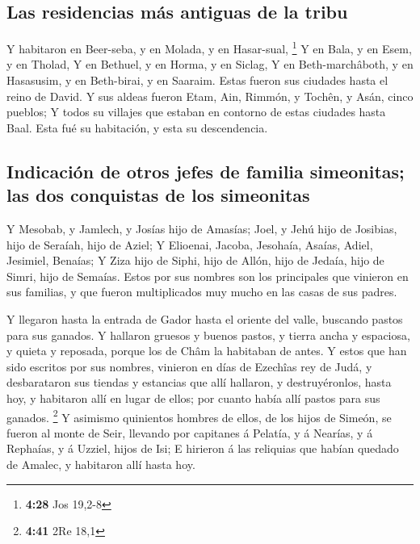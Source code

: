 \hypertarget{las-residencias-muxe1s-antiguas-de-la-tribu}{%
\subsection{Las residencias más antiguas de la
tribu}\label{las-residencias-muxe1s-antiguas-de-la-tribu}}

 Y habitaron en Beer-seba, y en Molada, y en Hasar-sual,
\footnote{\textbf{4:28} Jos 19,2-8}  Y en Bala, y en Esem,
y en Tholad,  Y en Bethuel, y en Horma, y en Siclag,
 Y en Beth-marchâboth, y en Hasasusim, y en Beth-birai, y
en Saaraim. Estas fueron sus ciudades hasta el reino de David.
 Y sus aldeas fueron Etam, Ain, Rimmón, y Tochên, y Asán,
cinco pueblos;  Y todos su villajes que estaban en contorno
de estas ciudades hasta Baal. Esta fué su habitación, y esta su
descendencia.

\hypertarget{indicaciuxf3n-de-otros-jefes-de-familia-simeonitas-las-dos-conquistas-de-los-simeonitas}{%
\subsection{Indicación de otros jefes de familia simeonitas; las dos
conquistas de los
simeonitas}\label{indicaciuxf3n-de-otros-jefes-de-familia-simeonitas-las-dos-conquistas-de-los-simeonitas}}

 Y Mesobab, y Jamlech, y Josías hijo de Amasías;
 Joel, y Jehú hijo de Josibias, hijo de Seraíah, hijo de
Aziel;  Y Elioenai, Jacoba, Jesohaía, Asaías, Adiel,
Jesimiel, Benaías;  Y Ziza hijo de Siphi, hijo de Allón,
hijo de Jedaía, hijo de Simri, hijo de Semaías.  Estos por
sus nombres son los principales que vinieron en sus familias, y que
fueron multiplicados muy mucho en las casas de sus padres.

 Y llegaron hasta la entrada de Gador hasta el oriente del
valle, buscando pastos para sus ganados.  Y hallaron
gruesos y buenos pastos, y tierra ancha y espaciosa, y quieta y
reposada, porque los de Châm la habitaban de antes.  Y
estos que han sido escritos por sus nombres, vinieron en días de
Ezechîas rey de Judá, y desbarataron sus tiendas y estancias que allí
hallaron, y destruyéronlos, hasta hoy, y habitaron allí en lugar de
ellos; por cuanto había allí pastos para sus ganados. \footnote{\textbf{4:41}
  2Re 18,1}  Y asimismo quinientos hombres de ellos, de los
hijos de Simeón, se fueron al monte de Seir, llevando por capitanes á
Pelatía, y á Nearías, y á Rephaías, y á Uzziel, hijos de Isi;
 E hirieron á las reliquias que habían quedado de Amalec, y
habitaron allí hasta hoy.


